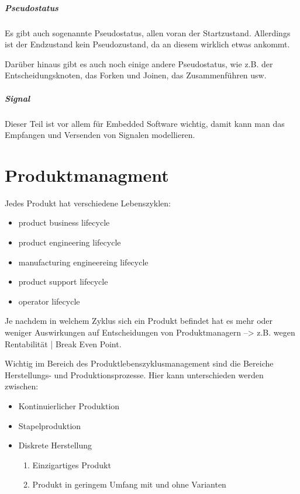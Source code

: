 \paragraph{Pseudostatus}
Es gibt auch sogenannte Pseudostatus, allen voran der Startzustand. Allerdings ist der Endzustand kein Pseudozustand, da an diesem wirklich etwas ankommt.

Darüber hinaus gibt es auch noch einige andere Pseudostatus, wie z.B. der Entscheidungsknoten, das Forken und Joinen, das Zusammenführen usw.

\paragraph{Signal}
Dieser Teil ist vor allem für Embedded Software wichtig, damit kann man das Empfangen und Versenden von Signalen modellieren.

\chapter{Produktmanagment}
Jedes Produkt hat verschiedene Lebenszyklen:

\begin{itemize}
\item product business lifecycle
\item product engineering lifecycle
\item manufacturing engineereing lifecycle
\item product support lifecycle
\item operator lifecycle
\end{itemize}

Je nachdem in welchem Zyklus sich ein Produkt befindet hat es mehr oder weniger Auswirkungen auf Entscheidungen von Produktmanagern --> z.B. wegen Rentabilität | Break Even Point.

Wichtig im Bereich des Produktlebenszyklusmanagement sind die Bereiche Herstellungs- und  Produktionsprozesse. Hier kann unterschieden werden zwischen:

\begin{itemize}
\item Kontinuierlicher Produktion
\item Stapelproduktion
\item Diskrete Herstellung
	\begin{enumerate}
	\item Einzigartiges Produkt
	\item Produkt in geringem Umfang mit und ohne Varianten
	\end{enumerate}
\end{itemize}


